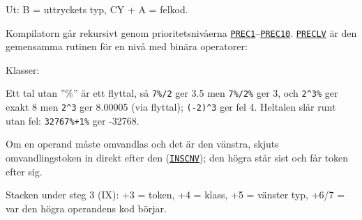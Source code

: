 \begin{Listing}
\begin{Note}
\par\noindent Ut:  B = uttryckets typ, CY + A = felkod.\par
\par\noindent Kompilatorn går rekursivt genom prioritetsnivåerna \hyperlink{l:PREC1}{\texttt{PREC1}}–\hyperlink{l:PREC10}{\texttt{PREC10}}. \hyperlink{l:PRECLV}{\texttt{PRECLV}} är den gemensamma rutinen för en nivå med binära operatorer:\par
\begin{Verb}
\end{Verb}
\par\noindent Klasser:\par
\begin{Verb}
\end{Verb}
\par\noindent Ett tal utan ”\%” är ett flyttal, så \texttt{7\%/2} ger 3.5 men \texttt{7\%/2\%} ger 3, och \texttt{2\^{}3\%} ger exakt 8 men \texttt{2\^{}3} ger 8.00005 (via flyttal); \texttt{(-2)\^{}3} ger fel 4. Heltalen slår runt utan fel: \texttt{32767\%+1\%} ger \mbox{-}32768.\par
\par\noindent Om en operand måste omvandlas och det är den vänstra, skjuts omvandlingstoken in direkt efter den (\hyperlink{l:INSCNV}{\texttt{INSCNV}}); den högra står sist och får token efter sig.\par
\par\noindent Stacken under steg 3 (IX): +3 = token, +4 = klass, +5 = vänster typ, +6/7 = var den högra operandens kod börjar.\par\end{Note}

\end{Listing}
